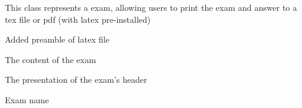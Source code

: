\documentclass[letterpaper,10pt,english]{sphinxmanual}
\begin{document}
\begin{fulllineitems}
\label{\detokenize{index:pytexexam.latexexam.LatexExam}}
This class represents a exam, allowing users to print the exam and answer to a tex file
or pdf (with latex pre-installed)

\begin{fulllineitems}
\label{\detokenize{index:pytexexam.latexexam.LatexExam.add_user_preamble}}
Added preamble of latex file

\end{fulllineitems}


\begin{fulllineitems}
\label{\detokenize{index:pytexexam.latexexam.LatexExam.exam_content}}
The content of the exam

\end{fulllineitems}


\begin{fulllineitems}
\label{\detokenize{index:pytexexam.latexexam.LatexExam.exam_header}}
The presentation of the exam’s header

\end{fulllineitems}


\begin{fulllineitems}
\label{\detokenize{index:pytexexam.latexexam.LatexExam.exam_title}}
Exam name


\end{fulllineitems}
\end{fulllineitems}
\end{document}
